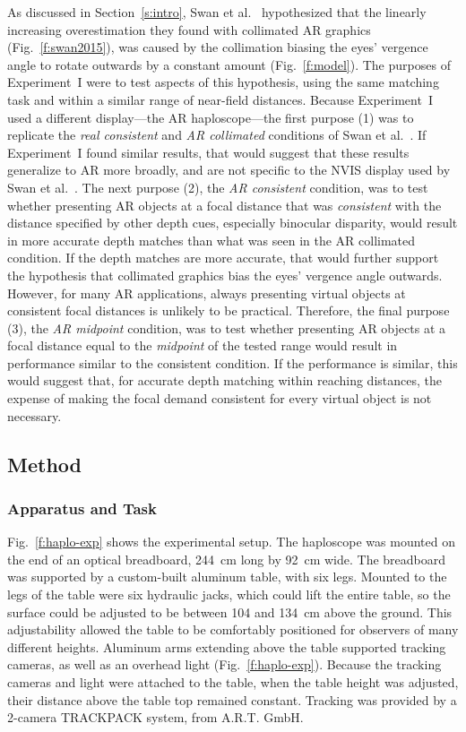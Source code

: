 \documentclass[10pt,journal,compsoc]{IEEEtran}
\makeatletter
\newcommand{\etal}{et al.\@\xspace} %
\makeatother
\begin{document}
As discussed in Section~\ref{s:intro}, Swan \etal~\cite{swan:2015} hypothesized that the linearly increasing overestimation they found with collimated AR graphics (Fig.~\ref{f:swan2015}), was caused by the collimation biasing the eyes' vergence angle to rotate outwards by a constant amount (Fig.~\ref{f:model}).  The purposes of Experiment~I were to test aspects of this hypothesis, using the same matching task and within a similar range of near-field distances. 
Because Experiment~I used a different display---the AR haploscope---the first purpose (1) was to replicate the \emph{real consistent} and \emph{AR collimated} conditions of Swan \etal~\cite{swan:2015}.  If Experiment~I found similar results, that would suggest that these results generalize to AR more broadly, and are not specific to the NVIS display used by Swan \etal~\cite{swan:2015}.
The next purpose (2), the \emph{AR consistent} condition, was to test whether presenting AR objects at a focal distance that was \emph{consistent} with the distance specified by other depth cues, especially binocular disparity, would result in more accurate depth matches than what was seen in the AR collimated condition.  If the depth matches are more accurate, that would further support the hypothesis that collimated graphics bias the eyes' vergence angle outwards.
However, for many AR applications, always presenting virtual objects at consistent focal distances is unlikely to be practical.  Therefore, the final purpose (3), the \emph{AR midpoint} condition, was to test whether presenting AR objects at a focal distance equal to the \emph{midpoint} of the tested range would result in performance similar to the consistent condition.  If the performance is similar, this would suggest that, for accurate depth matching within reaching distances, the expense of making the focal demand consistent for every virtual object is not necessary.

\subsection {Method}

\subsubsection {Apparatus and Task}
\label{s:app}



Fig.~\ref{f:haplo-exp} shows the experimental setup.  The haploscope was mounted on the end of an optical breadboard, 244~cm long by 92~cm wide.  The breadboard was supported by a custom-built aluminum table, with six legs.  Mounted to the legs of the table were six hydraulic jacks, which could lift the entire table, so the surface could be adjusted to be between 104 and 134~cm above the ground.  This adjustability allowed the table to be comfortably positioned for observers of many different heights.  Aluminum arms extending above the table supported tracking cameras, as well as an overhead light (Fig.~\ref{f:haplo-exp}).  Because the tracking cameras and light were attached to the table, when the table height was adjusted, their distance above the table top remained constant.  Tracking was provided by a 2-camera TRACKPACK system, from A.R.T. GmbH. 
\end{document}
